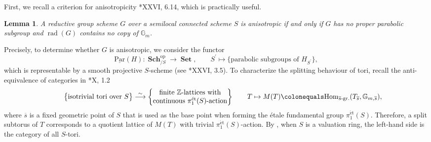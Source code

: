 \documentclass[a4paper,11pt,reqno]{amsart}
\newcommand{\bG}{\mathbb{G}}
\newcommand{\ra}{\rightarrow}
\newcommand{\pr}{^{\prime}}
\newcommand{\op}{^{\mathrm{op}}}
\newcommand{\ce}{\colonequals}
\newcommand{\ov}{\overline}
\newcommand{\un}{\underline}
\newcommand{\isoto}{\overset{\sim}{\longrightarrow}}
\newcommand{\etp}{\pi_1^{\mathrm{\acute{e}t}}}
\providecommand{\hkh}[1]{\left\{#1\right\}}
\DeclareMathOperator{\rad}{rad}			                       %
\DeclareMathOperator{\Sets}{\textbf{Set}}
\DeclareMathOperator{\Sch}{\textbf{Sch}}		                                                  %
\newcommand{\blem}{\begin{lemma}}
\newcommand{\elem}{\end{lemma}}
\newcommand{\x}{\text}
\newcommand{\qq}{\quad\quad}
\newcommand{\Par}{\un{\mathrm{Par}}}
\theoremstyle{plain}
\newtheorem{lemma}[numberingbase]{Lemma}
\theoremstyle{remark}
\theoremstyle{definition}
\theoremstyle{plain}
\theoremstyle{definition}
\theoremstyle{subsection-tweak}
\theoremstyle{subsection-tweak}
\numberwithin{equation}{subsection}
\begin{document}
      First, we recall a criterion for anisotropicity \cite{SGA3IIInew}*{XXVI, 6.14}, which is practically useful.
      \blem\label{ani-cri}
        A reductive group scheme $G$ over a semilocal connected scheme $S$ is anisotropic if and only if $G$ has no proper parabolic subgroup and $\rad(G)$ contains no copy of $\bG_{m}$.
      \elem
      Precisely, to determine whether $G$ is anisotropic, we consider the functor
      \[
      \Par(H)\colon \Sch_{/S}\op\ra \Sets,\qq S\pr\mapsto \{\x{parabolic subgroups of $H_{S\pr}$}\},
      \]
      which is representable by a smooth projective $S$-scheme (see \cite{SGA3IIInew}*{XXVI, 3.5}).
      To characterize the splitting behaviour of tori, recall the anti-equivalence of categories in \cite{SGA3II}*{X, 1.2}
      \[\qq \hkh{\begin{matrix}
                     \text{isotrivial tori over $S$}
                   \end{matrix} } \isoto
            \hkh{\begin{matrix}
                   \text{finite $\mathbb{Z}$-lattices with} \\
                   \text{continuous $\etp(S)$-action}
                 \end{matrix} } \qq T\mapsto M(T)\ce \mathrm{Hom}_{\x{$\ov{s}$-gr.}}(T_{\ov{s}}, \bG_{m,\ov{s}}),
      \]
      where $\ov{s}$ is a fixed geometric point of $S$ that is used as the base point when forming the \'etale fundamental group $\etp(S)$. 
      Therefore, a split subtorus of $T$ corresponds to a quotient lattice of $M(T)$ with trivial $\etp(S)$-action.
      By , when $S$ is a valuation ring, the left-hand side is the category of all $S$-tori. 
      
\end{document}
